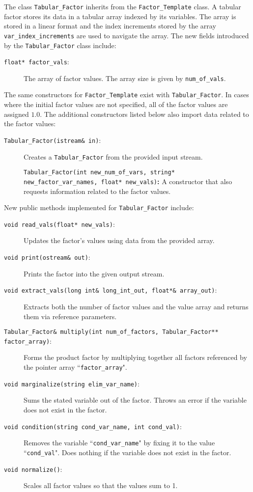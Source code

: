 \documentclass{article}
\begin{document}
The class \texttt{Tabular\_Factor} inherits from the \texttt{Factor\_Template} class. A tabular factor stores its data in a tabular array indexed by its variables. The array is stored in a linear format and the index increments stored by the array \texttt{var\_index\_increments} are used to navigate the array. The new fields introduced by the \texttt{Tabular\_Factor} class include: 

\begin{description}
\item[\texttt{float* factor\_vals}:] The array of factor values. The array size is given by \texttt{num\_of\_vals}.
\end{description}

The same constructors for \texttt{Factor\_Template} exist with \texttt{Tabular\_Factor}. In cases where the initial factor values are not specified, all of the factor values are assigned \(1.0\). The additional constructors listed below also import data related to the factor values:
\begin{description}
\item[\texttt{Tabular\_Factor(istream\& in)}:] Creates a \texttt{Tabular\_Factor} from the provided input stream.
\item[]\texttt{Tabular\_Factor(int new\_num\_of\_vars, string* new\_factor\_var\_names, float* new\_vals)}\textbf{:} A constructor that also requests information related to the factor values.
\end{description}

New public methods implemented for \texttt{Tabular\_Factor} include:

\begin{description}
\item[\texttt{void read\_vals(float* new\_vals)}:] Updates the factor's values using data from the provided array.
\item[\texttt{void print(ostream\& out)}:] Prints the factor into the given output stream.
\item[\texttt{void extract\_vals(long int\& long\_int\_out, float*\& array\_out)}:] Extracts both the number of factor values and the value array and returns them via reference parameters.
\item[\texttt{Tabular\_Factor\& multiply(int num\_of\_factors, Tabular\_Factor** factor\_array)}:] Forms the product factor by multiplying together all factors referenced by the pointer array ``\texttt{factor\_array}". 
\item[\texttt{void marginalize(string elim\_var\_name)}:] Sums the stated variable out of the factor. Throws an error if the variable does not exist in the factor.
\item[\texttt{void condition(string cond\_var\_name, int cond\_val)}:] Removes the variable ``\texttt{cond\_var\_name}" by fixing it to the value ``\texttt{cond\_val}". Does nothing if the variable does not exist in the factor.
\item[\texttt{void normalize()}:] Scales all factor values so that the values sum to 1.
\end{description}
\end{document}
